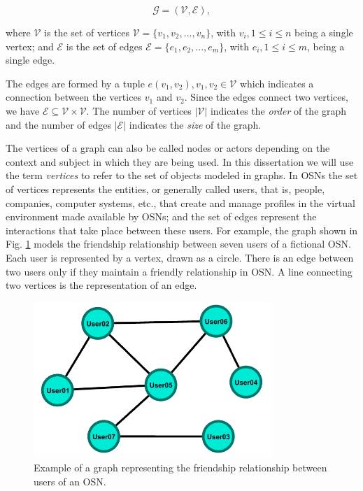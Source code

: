 \begin{equation} 
    \label{eq:graph}
    \mathcal{G}=(\mathcal{V},\mathcal{E}),
\end{equation}

where $\mathcal{V}$ is the set of vertices $\mathcal{V}=\{v_1, v_2, . . . , v_n\}$, with $v_i, 1 \leq i \leq n$ being a single vertex; and $\mathcal{E}$ is the set of edges $\mathcal{E}=\{e_1, e_2, . . . , e_m\}$, with $e_i, 1 \leq i \leq m$, being a single edge. 

The edges are formed by a tuple $e(v_1,v_2), v_1, v_2 \in \mathcal{V}$ which indicates a connection between the vertices $v_1$ and $v_2$. Since the edges connect two vertices, we have $\mathcal{E} \subseteq \mathcal{V} \times \mathcal{V}$. The number of vertices $|\mathcal{V}|$ indicates the {\em order} of the graph and the number of edges $|\mathcal{E}|$ indicates the {\em size} of the graph.

The vertices of a graph can also be called nodes or actors depending on the context and subject in which they are being used. In this dissertation we will use the term {\em vertices} to refer to the set of objects modeled in graphs. In OSNs the set of vertices represents the entities, or generally called users, that is, people, companies, computer systems, etc., that create and manage profiles in the virtual environment made available by OSNs; and the set of edges represent the interactions that take place between these users. For example, the graph shown in Fig. \ref{fig:ex_graph_undir} models the friendship relationship between seven users of a fictional OSN. Each user is represented by a vertex, drawn as a circle. There is an edge between two users only if they maintain a friendly relationship in OSN. A line connecting two vertices is the representation of an edge.

\begin{figure}[htb]
	\centering
	\includegraphics[width=0.8\textwidth]{fig/intro/ex_graph_undir.png}
	\caption{Example of a graph representing the friendship relationship between users of an OSN.}
	\label{fig:ex_graph_undir}
\end{figure}

